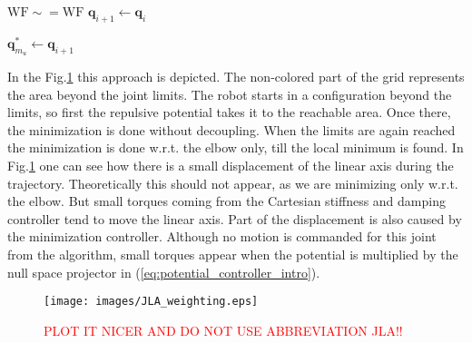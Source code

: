 \begin{algorithm}[H]
\begin{algorithmic}[1]
		
		

		
		\Else
		
		\State $\mathrm{WF \sim= WF }$ 
		\State $\mathbf{q}_{i+1} \leftarrow \mathbf{q}_i$
		
		\EndIf
		
		
		
		
		\EndIf
		
		\State $\mathbf{q}_{m_u}^\ast \leftarrow \mathbf{q}_{i+1}$ 
		
		\EndFor
	\end{algorithmic}
\end{algorithm}



  In the Fig.\ref{fig:wf_for_jla} this approach is depicted. The non-colored part of the grid represents the area beyond the joint limits. The robot starts in a configuration beyond the limits, so first the repulsive potential takes it to the reachable area. Once there, the minimization is done without decoupling. When the limits are again reached the minimization is done w.r.t. the elbow only, till the local minimum is found. In Fig.\ref{fig:wf_for_jla} one can see how there is a  small displacement of the linear axis during the trajectory. Theoretically this should not appear, as we are minimizing only w.r.t. the elbow. But small torques coming from the Cartesian stiffness and damping controller tend to move the linear axis. Part of the displacement is also caused by the minimization controller. Although no motion is commanded for this joint from the algorithm, small torques appear when the potential is multiplied by the null space projector in (\ref{eq:potential_controller_intro}).



\begin{figure}[!htb]
	\centerline{
		\texttt{[image: images/JLA\_weighting.eps]}}
	\caption{\textcolor{red}{PLOT IT NICER AND DO NOT USE ABBREVIATION JLA!!}}
	\label{fig:wf_for_jla}
\end{figure}




